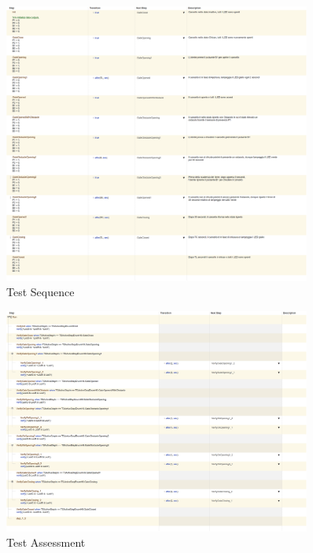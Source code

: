     \begin{figure}[H]
            \centering
            \includegraphics[width=0.9\textwidth]{figures/obstaclerepressed.png}
            \caption{Test Sequence}
            \label{obB1}
        \end{figure}
        
        \begin{figure}[H]
            \centering
            \includegraphics[width=0.9\textwidth]{figures/obstaclerepressed1.png}
            \caption{Test Assessment}
            \label{obB11}
        \end{figure}